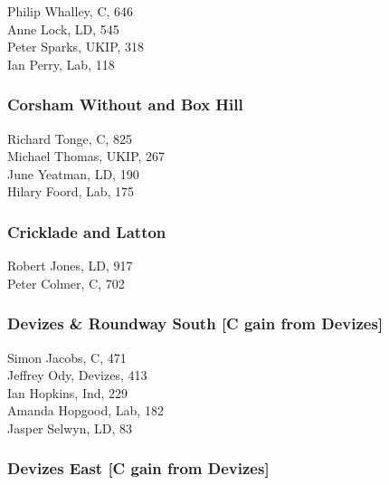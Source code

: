 \documentclass[a4paper,openany,10pt]{book}
\begin{document}


Philip Whalley, C, 646\\
Anne Lock, LD, 545\\
Peter Sparks, UKIP, 318\\
Ian Perry, Lab, 118\\


\subsubsection*{Corsham Without and Box Hill}



Richard Tonge, C, 825\\
Michael Thomas, UKIP, 267\\
June Yeatman, LD, 190\\
Hilary Foord, Lab, 175\\


\subsubsection*{Cricklade and Latton}



Robert Jones, LD, 917\\
Peter Colmer, C, 702\\


\subsubsection*{Devizes \& Roundway South \hspace*{\fill}\nolinebreak[1]%
\enspace\hspace*{\fill}
[C gain from Devizes]}



Simon Jacobs, C, 471\\
Jeffrey Ody, Devizes, 413\\
Ian Hopkins, Ind, 229\\
Amanda Hopgood, Lab, 182\\
Jasper Selwyn, LD, 83\\


\subsubsection*{Devizes East \hspace*{\fill}\nolinebreak[1]%
\enspace\hspace*{\fill}
[C gain from Devizes]}
\end{document}
